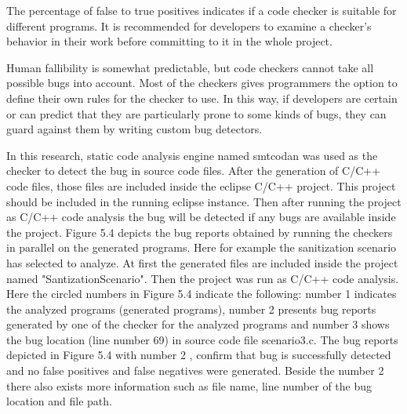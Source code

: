 The percentage of false to true positives indicates if a code checker is suitable for different programs. It is recommended for developers to examine a checker's behavior in their work before committing to it in the whole project. 

Human fallibility is somewhat predictable, but code checkers cannot take all possible bugs into account. Most of the checkers gives programmers the option to define their own rules for the checker to use. In this way, if developers are certain or can predict that they
are particularly prone to some kinds of bugs, they can guard against them by writing custom bug detectors. 

In this research, static code analysis engine named smtcodan was used as the checker to detect the bug in source code files. After the generation of C/C++ code files, those files are included inside the eclipse C/C++ project. This project should be included in the running eclipse instance. Then after running the project as C/C++ code analysis the bug will be detected if any bugs are available inside the project. Figure 5.4 depicts the bug reports obtained by running the checkers in parallel on the generated programs. Here for example the sanitization scenario has selected to analyze. At first the generated files are included inside the project named "SantizationScenario". Then the project was run as C/C++ code analysis. Here the circled numbers in Figure 5.4 indicate the following: number 1 indicates the analyzed programs (generated programs), number
2 presents bug reports generated by one of the checker for the analyzed programs and number 3 shows the
bug location (line number 69) in source code file scenario3.c. The bug reports depicted in Figure 5.4 with number
2 , confirm that bug is successfully detected and no
false positives and false negatives were generated. Beside the number 2 there also exists more information such as file name, line number of the bug location and file path. 

